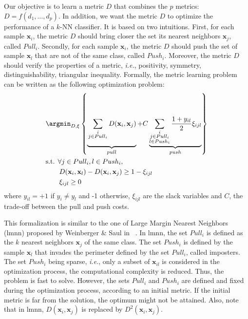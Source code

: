 Our objective is to learn a metric $D$ that combines the $p$ metrics: $D=f(d_1, \ldots, d_p)$. In addition, we want the metric $D$ to optimize the performance of a $k$-NN classifier. It is based on two intuitions. First, for each sample $\textbf{x}_i$, the metric $D$ should bring closer the set its nearest neighbors $\textbf{x}_j$, called $Pull_i$. Secondly, for each sample $\textbf{x}_i$, the metric $D$ should push the set of sample $\textbf{x}_l$ that are not of the same class, called  $Push_i$. Moreover, the metric $D$ should verify the properties of a metric, \textit{i.e.}, positivity, symmetry, distinguishability, triangular inequality. Formally, the metric learning problem can be written as the following optimization problem:
\begin{equation}
\begin{aligned}
&\displaystyle 		\argmin_{D,\xi} \left\lbrace \underbrace{
	\vphantom{ \sum\limits_{\substack{i \\ j \in Pull_i \\ l \in Push_i}} \frac{1+y_{il}}{2} \xi_{ijl} }
	\sum_{\substack{i \\ j \in Pull_i}}D(\textbf{x}_{i},\textbf{x}_{j})
}_{pull}
+ C
\underbrace{
	\sum\limits_{\substack{i \\ j \in Pull_i \\ l \in Push_i}} \frac{1+y_{il}}{2} \xi_{ijl}
}
_{push} \right\rbrace  \\
&\text{s.t.  } \forall j \in Pull_i, l \in Push_i, \\
& \qquad D(\textbf{x}_{i},\textbf{x}_{l})-D(\textbf{x}_{i},\textbf{x}_{j}) \geq 1-\xi_{ijl} \\
& \qquad \xi_{ijl} \geq 0 
\label{eq:OriginalOptimizationProblem_Objective} 
\end{aligned}
\end{equation}
\noindent where $y_{il} = +1$ if $y_i \neq y_l$ and -1 otherwise, $\xi_{ijl}$ are the slack variables and $C$, the trade-off between the pull and push costs. 

This formalization is similar to the one of Large Margin Nearest Neighbors ({\sc lmnn}) proposed by Weinberger \& Saul in ~\cite{Weinberger2009}. In {\sc lmnn}, the set $Pull_i$ is defined as the $k$ nearest neighbors $\textbf{x}_j$ of the same class. The set $Push_i$ is defined by the sample $\textbf{x}_l$ that invades the perimeter defined by the set $Pull_i$, called imposters. The set $Push_i$ being sparse, \textit{i.e.}, only a subset of $\textbf{x}_{il}$ is considered in the optimization process, the computational complexity is reduced. Thus, the problem is fast to solve. However, the sets $Pull_i$ and $Push_i$ are defined and fixed during the optimization process, according to an initial metric. If the initial metric is far from the solution, the optimum might not be attained. Also, note that in {\sc lmnn}, $D(\textbf{x}_i,\textbf{x}_j)$ is replaced by $D^2(\textbf{x}_i,\textbf{x}_j)$.

